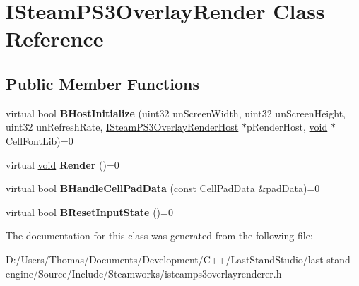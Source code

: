 \hypertarget{classISteamPS3OverlayRender}{}\section{I\+Steam\+P\+S3\+Overlay\+Render Class Reference}
\label{classISteamPS3OverlayRender}
\subsection*{Public Member Functions}
\begin{DoxyCompactItemize}
\item 
\hypertarget{classISteamPS3OverlayRender_a4bff87fff2d1b7a0518e7e14d1dadf2a}{}virtual bool {\bfseries B\+Host\+Initialize} (uint32 un\+Screen\+Width, uint32 un\+Screen\+Height, uint32 un\+Refresh\+Rate, \hyperlink{classISteamPS3OverlayRenderHost}{I\+Steam\+P\+S3\+Overlay\+Render\+Host} $\ast$p\+Render\+Host, \hyperlink{SDL__audio_8h_a52835ae37c4bb905b903cbaf5d04b05f}{void} $\ast$Cell\+Font\+Lib)=0\label{classISteamPS3OverlayRender_a4bff87fff2d1b7a0518e7e14d1dadf2a}

\item 
\hypertarget{classISteamPS3OverlayRender_ad1579d69d1a96ab0e2fdf0fe9d3bedd5}{}virtual \hyperlink{SDL__audio_8h_a52835ae37c4bb905b903cbaf5d04b05f}{void} {\bfseries Render} ()=0\label{classISteamPS3OverlayRender_ad1579d69d1a96ab0e2fdf0fe9d3bedd5}

\item 
\hypertarget{classISteamPS3OverlayRender_a293c3b6dd03f1a5de1e6346bced4e58d}{}virtual bool {\bfseries B\+Handle\+Cell\+Pad\+Data} (const Cell\+Pad\+Data \&pad\+Data)=0\label{classISteamPS3OverlayRender_a293c3b6dd03f1a5de1e6346bced4e58d}

\item 
\hypertarget{classISteamPS3OverlayRender_a4f5d18304e355703ef94bf84a4f1057f}{}virtual bool {\bfseries B\+Reset\+Input\+State} ()=0\label{classISteamPS3OverlayRender_a4f5d18304e355703ef94bf84a4f1057f}

\end{DoxyCompactItemize}


The documentation for this class was generated from the following file\+:\begin{DoxyCompactItemize}
\item 
D\+:/\+Users/\+Thomas/\+Documents/\+Development/\+C++/\+Last\+Stand\+Studio/last-\/stand-\/engine/\+Source/\+Include/\+Steamworks/isteamps3overlayrenderer.\+h\end{DoxyCompactItemize}
